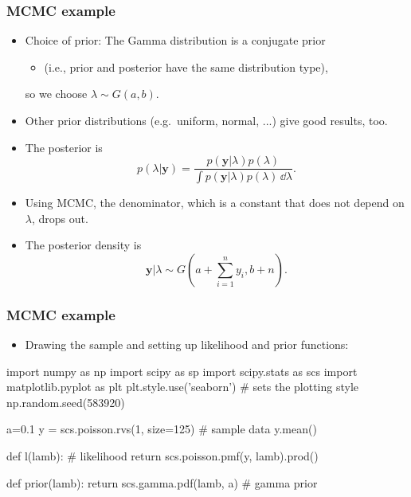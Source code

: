 \documentclass[xcolor=table,10pt]{beamer}
\begin{document}
\begin{frame}
  \frametitle{MCMC example}
  \begin{itemize}
  \item Choice of prior: The Gamma
    distribution is a \alert{conjugate prior}
    \begin{itemize}
    \item (i.e., prior and posterior have the same distribution type),
    \end{itemize}
    so we choose $\lambda\sim G(a,b)$.
  \item Other prior distributions (e.g.\ uniform, normal, ...) give
    good results, too.
  \item The posterior is 
    \begin{equation*}
      p(\lambda|\bm y) = \frac{p(\bm y|\lambda) p(\lambda)} {\int
        p(\bm y|\lambda)p(\lambda)\, \dd \lambda}. 
    \end{equation*}
    \vspace*{-\baselineskip}
  \item Using MCMC, the denominator, which is a constant that does not
    depend on $\lambda$, drops out.
  \item The posterior density is
    \begin{equation*}
      \bm y|\lambda \sim G\left(a + \sum_{i=1}^n y_i, b+n\right). 
    \end{equation*}
  \end{itemize}
\end{frame}

\begin{frame}[fragile]
  \frametitle{MCMC example}
  \begin{itemize}
  \item Drawing the sample and setting up likelihood and prior functions:
  \end{itemize}
{\scriptsize%
\begin{pyconsole}[session1][frame=single]
import numpy as np
import scipy as sp
import scipy.stats as scs
import matplotlib.pyplot as plt
plt.style.use('seaborn')  # sets the plotting style
np.random.seed(583920)

a=0.1
y = scs.poisson.rvs(1, size=125) # sample data
y.mean()

def l(lamb): # likelihood
    return scs.poisson.pmf(y, lamb).prod()

def prior(lamb):    
    return scs.gamma.pdf(lamb, a) # gamma prior
\end{pyconsole}
}
\end{frame}
\end{document}
